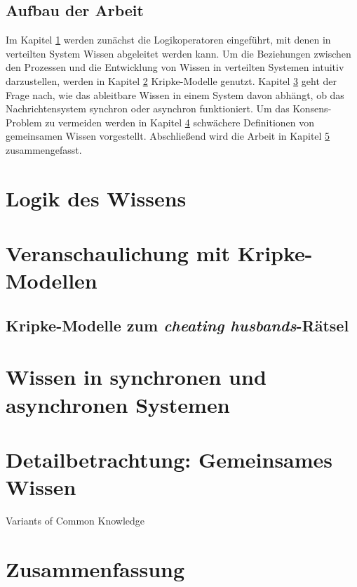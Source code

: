 \documentclass{llncs}
\begin{document}
\subsection{Aufbau der Arbeit}
Im Kapitel \ref{Logik} werden zunächst die Logikoperatoren eingeführt, mit denen in verteilten System Wissen abgeleitet werden kann.
Um die Beziehungen zwischen den Prozessen und die Entwicklung von Wissen in verteilten Systemen intuitiv darzustellen, werden in Kapitel \ref{Kripke-Modelle} Kripke-Modelle genutzt. Kapitel \ref{sync_vs_async} geht der Frage nach, wie das ableitbare Wissen in einem System davon abhängt, ob das Nachrichtensystem synchron oder asynchron funktioniert. Um das Konsens-Problem zu vermeiden werden in Kapitel \ref{GemeinsamesWissen} schwächere Definitionen von gemeinsamen Wissen vorgestellt.
Abschließend wird die Arbeit in Kapitel \ref{Zusammenfassung} zusammengefasst.

\section{Logik des Wissens}
\label{Logik}
\section{Veranschaulichung mit Kripke-Modellen}
\label{Kripke-Modelle}
\subsection{Kripke-Modelle zum \textit{cheating husbands}-Rätsel}

\section{Wissen in synchronen und asynchronen Systemen}
\label{sync_vs_async}

\section{Detailbetrachtung: Gemeinsames Wissen}
\label{GemeinsamesWissen}
Variants of Common Knowledge

\section{Zusammenfassung}
\label{Zusammenfassung}



\end{document}

